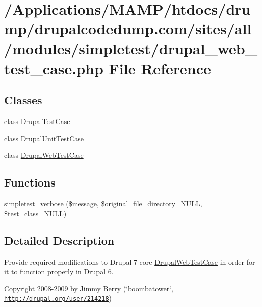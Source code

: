 \hypertarget{drupal__web__test__case_8php}{
\section{/Applications/MAMP/htdocs/drump/drupalcodedump.com/sites/all/modules/simpletest/drupal\_\-web\_\-test\_\-case.php File Reference}
\label{drupal__web__test__case_8php}
}
\subsection*{Classes}
\begin{DoxyCompactItemize}
\item 
class \hyperlink{class_drupal_test_case}{DrupalTestCase}
\item 
class \hyperlink{class_drupal_unit_test_case}{DrupalUnitTestCase}
\item 
class \hyperlink{class_drupal_web_test_case}{DrupalWebTestCase}
\end{DoxyCompactItemize}
\subsection*{Functions}
\begin{DoxyCompactItemize}
\item 
\hyperlink{drupal__web__test__case_8php_ac8ef212d48360d65d8a3697e709565d7}{simpletest\_\-verbose} (\$message, \$original\_\-file\_\-directory=NULL, \$test\_\-class=NULL)
\end{DoxyCompactItemize}


\subsection{Detailed Description}
Provide required modifications to Drupal 7 core \hyperlink{class_drupal_web_test_case}{DrupalWebTestCase} in order for it to function properly in Drupal 6.

Copyright 2008-\/2009 by Jimmy Berry (\char`\"{}boombatower\char`\"{}, \href{http://drupal.org/user/214218}{\tt http://drupal.org/user/214218}) 


